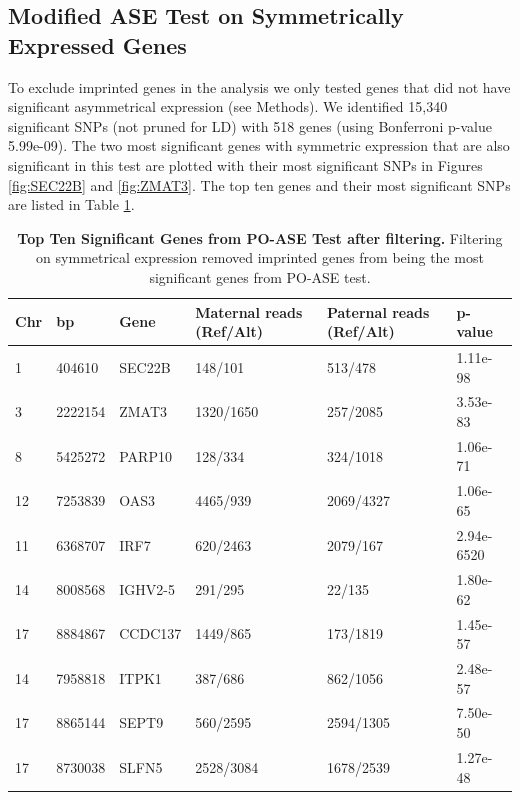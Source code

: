 \subsection{Modified ASE Test on Symmetrically Expressed Genes}\label{Modified ASE Test on Symmetrically Expressed Genes} 
To exclude imprinted genes in the analysis we only tested genes that did not have significant asymmetrical expression (see Methods). We identified 15,340 significant SNPs (not pruned for LD) with 518 genes (using Bonferroni p-value 5.99e-09). The two most significant genes with symmetric expression that are also significant in this test are plotted with their most significant SNPs in Figures \ref{fig:SEC22B} and \ref{fig:ZMAT3}. The top ten genes and their most significant SNPs are listed in Table \ref{tab:poase2}.


\begin{table}[!htb]
\centering
\begin{adjustbox}{width={\textwidth}}
\begin{tabular}{@{}p{1cm}p{3cm}p{3cm}p{5cm}p{5cm}p{3cm}@{}}
 \toprule  Chr & bp & Gene & Maternal reads (Ref/Alt) & Paternal reads (Ref/Alt) & p-value \\ \midrule
1 & 404610 & SEC22B & 148/101 & 513/478 & 1.11e-98 \\
3 & 2222154 & ZMAT3 & 1320/1650 & 257/2085 & 3.53e-83\\
8 & 5425272 & PARP10 & 128/334 & 324/1018 & 1.06e-71 \\
12 & 7253839 & OAS3 & 4465/939 & 2069/4327 & 1.06e-65 \\
11 & 6368707 & IRF7 & 620/2463 & 2079/167 & 2.94e-6520 \\
14 & 8008568 & IGHV2-5 & 291/295 & 22/135 & 1.80e-62 \\
17 & 8884867 & CCDC137 & 1449/865 & 173/1819 & 1.45e-57\\
14 & 7958818 & ITPK1 & 387/686 & 862/1056 & 2.48e-57\\
17 & 8865144 & SEPT9 & 560/2595 & 2594/1305 & 7.50e-50\\
17 & 8730038 & SLFN5 & 2528/3084 & 1678/2539 & 1.27e-48\\  \bottomrule
\end{tabular}
\end{adjustbox}
\caption[Top Ten Significant Genes from PO-ASE Test after filtering.]{\textbf{Top Ten Significant Genes from PO-ASE Test after filtering.} Filtering on symmetrical expression removed imprinted genes from being the most significant genes from PO-ASE test.}
\label{tab:poase2}
\end{table}



